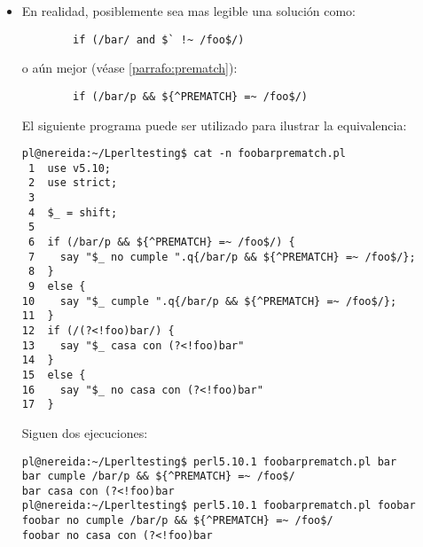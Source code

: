 \begin{itemize}
\item
En realidad, posiblemente sea mas legible una solución como:
\begin{verbatim}
        if (/bar/ and $` !~ /foo$/) 
\end{verbatim}
o aún mejor (véase \ref{parrafo:prematch}):
\begin{verbatim}
        if (/bar/p && ${^PREMATCH} =~ /foo$/)
\end{verbatim}
El siguiente programa puede ser utilizado para ilustrar la equivalencia:
\begin{verbatim}
pl@nereida:~/Lperltesting$ cat -n foobarprematch.pl
 1  use v5.10;
 2  use strict;
 3
 4  $_ = shift;
 5
 6  if (/bar/p && ${^PREMATCH} =~ /foo$/) {
 7    say "$_ no cumple ".q{/bar/p && ${^PREMATCH} =~ /foo$/};
 8  }
 9  else {
10    say "$_ cumple ".q{/bar/p && ${^PREMATCH} =~ /foo$/};
11  }
12  if (/(?<!foo)bar/) {
13    say "$_ casa con (?<!foo)bar"
14  }
15  else {
16    say "$_ no casa con (?<!foo)bar"
17  }
\end{verbatim}
Siguen dos ejecuciones:
\begin{verbatim}
pl@nereida:~/Lperltesting$ perl5.10.1 foobarprematch.pl bar
bar cumple /bar/p && ${^PREMATCH} =~ /foo$/
bar casa con (?<!foo)bar
pl@nereida:~/Lperltesting$ perl5.10.1 foobarprematch.pl foobar
foobar no cumple /bar/p && ${^PREMATCH} =~ /foo$/
foobar no casa con (?<!foo)bar
\end{verbatim}
\end{itemize}


